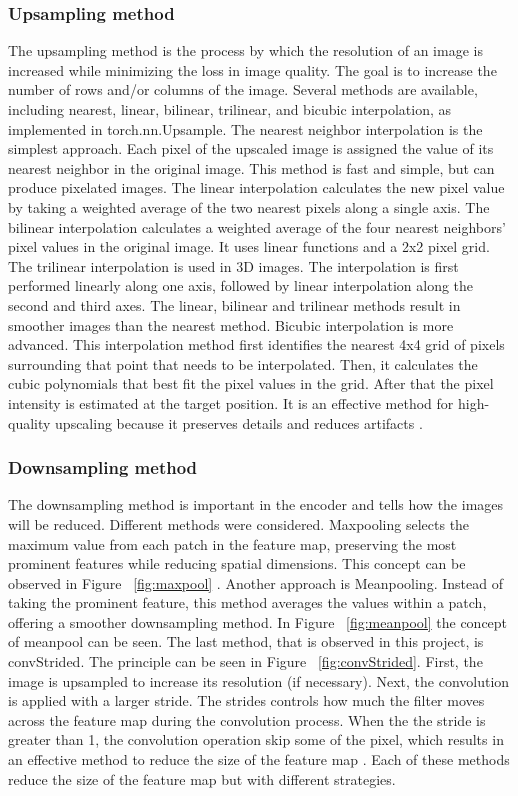 \documentclass[twocolumn]{article}
\begin{document}
\subsubsection{Upsampling method}
The upsampling method is the process by which the resolution of an image is increased while minimizing the loss in image quality. 
The goal is to increase the number of rows and/or columns of the image. Several methods are available, including nearest, linear, bilinear, trilinear, and bicubic interpolation, as implemented in torch.nn.Upsample.
The nearest neighbor interpolation is the simplest approach. 
Each pixel of the upscaled image is assigned the value of its nearest neighbor in the original image. 
This method is fast and simple, but can produce pixelated images.
The linear interpolation calculates the new pixel value by taking a weighted average of the two nearest pixels along a single axis. 
The bilinear interpolation calculates a weighted average of the four nearest neighbors' pixel values in the original image. 
It uses linear functions and a 2x2 pixel grid. 
The trilinear interpolation is used in 3D images. 
The interpolation is first performed linearly along one axis, followed by linear interpolation along the second and third axes. 
The linear, bilinear and trilinear methods result in smoother images than the nearest method.
Bicubic interpolation is more advanced. This interpolation method first identifies the nearest 4x4 grid of pixels surrounding that point that needs to be interpolated. 
Then, it calculates the cubic polynomials that best fit the pixel values in the grid. 
After that the pixel intensity is estimated at the target position. 
It is an effective method for high-quality upscaling because it preserves details and reduces artifacts \cite{amanrao-2023} \cite{unknown-author-2025}.

\subsubsection{Downsampling method}
The downsampling method is important in the encoder and tells how the images will be reduced. Different methods were considered. 
Maxpooling selects the maximum value from each patch in the feature map, preserving the most prominent features while reducing spatial dimensions. 
This concept can be observed in Figure ~\ref{fig:maxpool} \cite{dhanushkumar-2023}.
Another approach is Meanpooling. Instead of taking the prominent feature, this method averages the values within a patch, offering a smoother downsampling method. 
In Figure ~\ref{fig:meanpool} the concept of meanpool can be seen.
The last method, that is observed in this project, is convStrided. The principle can be seen in Figure ~\ref{fig:convStrided}. 
First, the image is upsampled to increase its resolution (if necessary). 
Next, the convolution is applied with a larger stride. 
The strides controls how much the filter moves across the feature map during the convolution process. 
When the the stride is greater than 1, the convolution operation skip some of the pixel, which results in an effective method to reduce the size of the feature map \cite{unknown-author-no-date2}.
Each of these methods reduce the size of the feature map but with different strategies.
\end{document}

